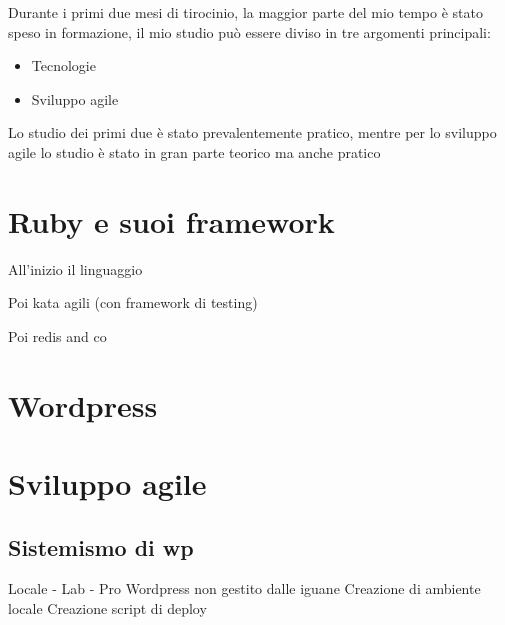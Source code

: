 


Durante i primi due mesi di tirocinio, la maggior parte del mio tempo è stato speso in formazione,
il mio studio può essere diviso in tre argomenti principali:

\begin{itemize}
\item Tecnologie
\item Sviluppo agile
\end{itemize}

Lo studio dei primi due è stato prevalentemente pratico, mentre per lo sviluppo
agile lo studio è stato in gran parte teorico ma anche pratico

\section{Ruby e suoi framework}

All'inizio il linguaggio

Poi kata agili (con framework di testing)

Poi redis and co


\section{Wordpress}

\section{Sviluppo agile}


\subsection {Sistemismo di wp}
Locale - Lab - Pro
Wordpress non gestito dalle iguane
Creazione di ambiente locale 
Creazione script di deploy
